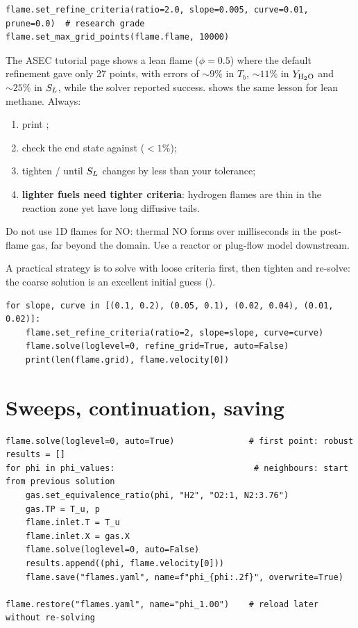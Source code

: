 \begin{lstlisting}
flame.set_refine_criteria(ratio=2.0, slope=0.005, curve=0.01, prune=0.0)  # research grade
flame.set_max_grid_points(flame.flame, 10000)
\end{lstlisting}

\begin{warning}
The ASEC tutorial page shows a lean  flame ($\phi=0.5$) where the default refinement gave only 27 points,
with errors of $\sim9\%$ in $T_b$, $\sim11\%$ in $Y_{\mathrm{H_2O}}$ and $\sim25\%$ in $S_L$, while the solver
reported success.  shows the same lesson for lean methane. Always:
\begin{enumerate}
  \item print ;
  \item check the end state against  ($<1\%$);
  \item tighten / until $S_L$ changes by less than your tolerance;
  \item \textbf{lighter fuels need tighter criteria}: hydrogen flames are thin in the reaction zone yet
        have long diffusive tails.
\end{enumerate}
Do not use 1D flames for NO: thermal NO forms over milliseconds in the post-flame gas, far beyond the
domain. Use a reactor or plug-flow model downstream.
\end{warning}

A practical strategy is to solve with loose criteria first, then tighten and re-solve: the coarse
solution is an excellent initial guess ().
\begin{lstlisting}
for slope, curve in [(0.1, 0.2), (0.05, 0.1), (0.02, 0.04), (0.01, 0.02)]:
    flame.set_refine_criteria(ratio=2, slope=slope, curve=curve)
    flame.solve(loglevel=0, refine_grid=True, auto=False)
    print(len(flame.grid), flame.velocity[0])
\end{lstlisting}

\section{Sweeps, continuation, saving}
\label{sec:ct-sweeps}

\begin{lstlisting}
flame.solve(loglevel=0, auto=True)               # first point: robust
results = []
for phi in phi_values:                            # neighbours: start from previous solution
    gas.set_equivalence_ratio(phi, "H2", "O2:1, N2:3.76")
    gas.TP = T_u, p
    flame.inlet.T = T_u
    flame.inlet.X = gas.X
    flame.solve(loglevel=0, auto=False)
    results.append((phi, flame.velocity[0]))
    flame.save("flames.yaml", name=f"phi_{phi:.2f}", overwrite=True)

flame.restore("flames.yaml", name="phi_1.00")    # reload later without re-solving
\end{lstlisting}

